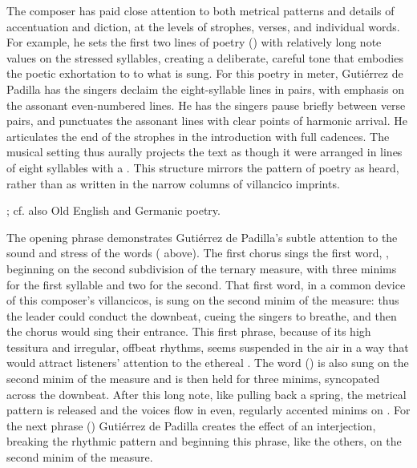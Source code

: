 The composer has paid close attention to both metrical patterns and details of
accentuation and diction, at the levels of strophes, verses, and individual
words.
For example, he sets the first two lines of poetry () with
relatively long note values on the stressed syllables, creating a deliberate,
careful tone that embodies the poetic exhortation to  to
what is sung.
For this poetry in  meter, Gutiérrez de Padilla has the singers
declaim the eight-syllable lines in pairs, with emphasis on the assonant
even-numbered lines.
He has the singers pause briefly between verse pairs, and punctuates the
assonant lines with clear points of harmonic arrival.
He articulates the end of the strophes in the introduction with full cadences.
The musical setting thus aurally projects the text as though it were arranged
in lines of eight syllables with a .
This structure mirrors the pattern of  poetry as heard, rather
than as written in the narrow columns of villancico imprints.%
\begin{Footnote}
    \Autocites
    {Navarro:Metrica}
    [this structure is used in the ][32--50]
    {MenendezPidal:Crestomatia}; 
    cf. also Old English and Germanic poetry.
\end{Footnote}


The opening phrase demonstrates Gutiérrez de Padilla's subtle attention to the
sound and stress of the words ( above).
The first chorus sings the first word, , beginning on the second
subdivision of the ternary measure, with three minims for the first syllable and
two for the second.
That first word, in a common device of this composer's villancicos, is sung on
the second minim of the measure: thus the leader could conduct the downbeat,
cueing the singers to breathe, and then the chorus would sing their entrance. 
This first phrase, because of its high tessitura and irregular, offbeat rhythms,
seems suspended in the air in a way that would attract listeners' attention to
the ethereal . 
The word  () is also sung on the second minim of the
measure and is then held for three minims, syncopated across the downbeat.
After this long note, like pulling back a spring, the metrical pattern is
released and the voices flow in even, regularly accented minims on .
For the next phrase () Gutiérrez de Padilla
creates the effect of an interjection, breaking the rhythmic pattern and
beginning this phrase, like the others, on the second minim of the measure.

